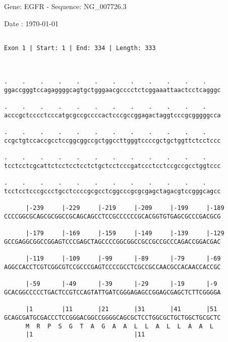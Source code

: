 \documentclass{article}
\begin{document}
\begin{center}
\begin{large}
 Gene: EGFR - Sequence: NG\_007726.3
 
 Date : \today
\end{large}
\end{center}
 \begin{Verbatim}
 
Exon 1 | Start: 1 | End: 334 | Length: 333



.    .    .    .    .    .    .    .    .    .    .    .    
ggaccgggtccagaggggcagtgctgggaacgcccctctcggaaattaactcctcagggc
                                                            
.    .    .    .    .    .    .    .    .    .    .    .    
acccgctcccctcccatgcgccgccccactcccgccggagactaggtcccgcgggggcca
                                                            
.    .    .    .    .    .    .    .    .    .    .    .    
ccgctgtccaccgcctccggcggccgctggccttgggtccccgctgctggttctcctccc
                                                            
.    .    .    .    .    .    .    .    .    .    .    .    
tcctcctcgcattctcctcctcctctgctcctcccgatccctcctccgccgcctggtccc
                                                            
.    .    .    .    .    .    .    .    .    .    .    .    
tcctcctcccgccctgcctccccgcgcctcggcccgcgcgagctagacgtccgggcagcc
                                                            
      |-239     |-229     |-219     |-209     |-199     |-189
CCCCGGCGCAGCGCGGCCGCAGCAGCCTCCGCCCCCCGCACGGTGTGAGCGCCCGACGCG
                                                            
      |-179     |-169     |-159     |-149     |-139     |-129
GCCGAGGCGGCCGGAGTCCCGAGCTAGCCCCGGCGGCCGCCGCCGCCCAGACCGGACGAC
                                                            
      |-119     |-109     |-99      |-89      |-79      |-69
AGGCCACCTCGTCGGCGTCCGCCCGAGTCCCCGCCTCGCCGCCAACGCCACAACCACCGC
                                                            
      |-59      |-49      |-39      |-29      |-19      |-9 
GCACGGCCCCCTGACTCCGTCCAGTATTGATCGGGAGAGCCGGAGCGAGCTCTTCGGGGA
                                                            
      |1        |11       |21       |31       |41       |51 
GCAGCGATGCGACCCTCCGGGACGGCCGGGGCAGCGCTCCTGGCGCTGCTGGCTGCGCTC
      M  R  P  S  G  T  A  G  A  A  L  L  A  L  L  A  A  L  
      |1                            |11                     
  

\end{Verbatim}
\end{document}
